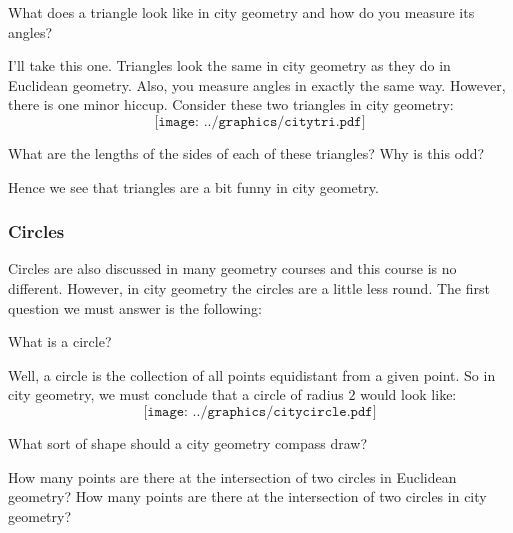 \begin{question} What does a triangle look like in city geometry and how do you measure its angles? 
\end{question}

I'll take this one. Triangles look the same in city geometry as they
do in Euclidean geometry. Also, you measure angles in exactly the same
way. However, there is one minor hiccup. Consider these two triangles
in city geometry:
\[
\texttt{[image: ../graphics/citytri.pdf]}
\]
\begin{question} 
What are the lengths of the sides of each of these triangles? Why is
this odd?
\end{question}
\QM 

Hence we see that triangles are a bit funny in city geometry.

\subsubsection{Circles}

Circles are also discussed in many geometry courses and this course is
no different. However, in city geometry the circles are a little less
round. The first question we must answer is the following:

\begin{question} What is a circle?
\end{question}

Well, a circle is the collection of all points equidistant from a
given point. So in city geometry, we must conclude that a circle of
radius $2$ would look like:
\[
\texttt{[image: ../graphics/citycircle.pdf]}
\]
\begin{question} What sort of shape should a city geometry compass draw?
\end{question}
\QM

\begin{question} 
How many points are there at the intersection of two circles in
Euclidean geometry? How many points are there at the intersection of
two circles in city geometry?
\end{question}
\QM


